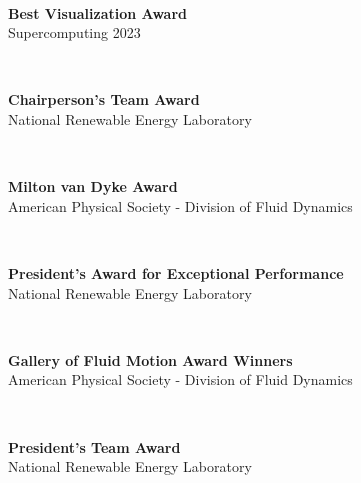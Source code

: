 \documentclass[11pt,letterpaper]{article}
\begin{document}
\begin{minipage}[t]{0.15\textwidth}%
\end{minipage}\\[2ex]%
\begin{minipage}[t]{0.82\textwidth}%
  \textbf{Best Visualization Award}\\%
  Supercomputing 2023%
\end{minipage}\hfill%
\begin{minipage}[t]{0.15\textwidth}%
\end{minipage}\\[2ex]%
\begin{minipage}[t]{0.82\textwidth}%
  \textbf{Chairperson’s Team Award}\\%
  National Renewable Energy Laboratory%
\end{minipage}\hfill%
\begin{minipage}[t]{0.15\textwidth}%
\end{minipage}\\[2ex]%
\begin{minipage}[t]{0.82\textwidth}%
  \textbf{Milton van Dyke Award}\\%
  American Physical Society - Division of Fluid Dynamics%
\end{minipage}\hfill%
\begin{minipage}[t]{0.15\textwidth}%
\end{minipage}\\[2ex]%
\begin{minipage}[t]{0.82\textwidth}%
  \textbf{President’s Award for Exceptional Performance}\\%
  National Renewable Energy Laboratory%
\end{minipage}\hfill%
\begin{minipage}[t]{0.15\textwidth}%
\end{minipage}\\[2ex]%
\begin{minipage}[t]{0.82\textwidth}%
  \textbf{Gallery of Fluid Motion Award Winners}\\%
  American Physical Society - Division of Fluid Dynamics%
\end{minipage}\hfill%
\begin{minipage}[t]{0.15\textwidth}%
\end{minipage}\\[2ex]%
\begin{minipage}[t]{0.82\textwidth}%
  \textbf{President’s Team Award}\\%
  National Renewable Energy Laboratory%
\end{minipage}\hfill%
\end{document}
